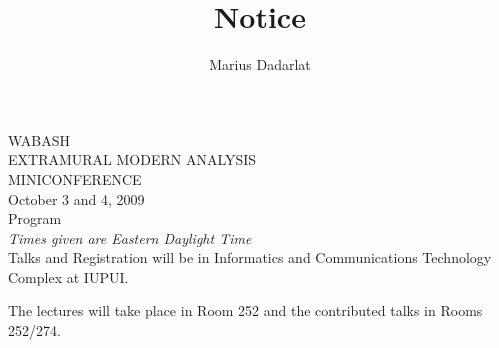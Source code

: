\documentclass[10pt]{article}                                  %
\title{Notice}                                               %
\author{Marius Dadarlat}                                          %
\begin{document}
\vspace{2ex}
\begin{center}
{\TitleFont WABASH}\\
\smallskip
{\SubTitleFont EXTRAMURAL MODERN ANALYSIS}\\
\smallskip
{\TitleFont MINICONFERENCE}\\
\vspace{.2in}
 {\DateFont   October 3 and 4, 2009}\\
\vspace{.2in}
{\TitleFont Program}\\[.2in]

{\em Times given are Eastern Daylight Time}\\[.3in]


Talks and Registration will be in Informatics and Communications Technology Complex at IUPUI.

 The
lectures will take place in Room 252 and the contributed talks in Rooms 252/274.
\end{center} \smallskip
\end{document}
